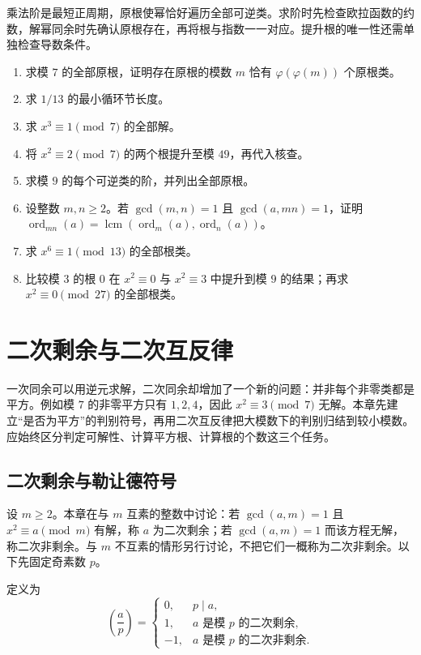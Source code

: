 \documentclass[UTF8,12pt,a4paper,fontset=fandol]{ctexbook}
\begin{document}
乘法阶是最短正周期，原根使幂恰好遍历全部可逆类。求阶时先检查欧拉函数的约数，解幂同余时先确认原根存在，再将根与指数一一对应。提升根的唯一性还需单独检查导数条件。

\begin{enumerate}
 \item 求模 $7$ 的全部原根，证明存在原根的模数 $m$ 恰有 $\varphi(\varphi(m))$ 个原根类。
 \item 求 $1/13$ 的最小循环节长度。
 \item 求 $x^3\equiv1\pmod7$ 的全部解。
 \item 将 $x^2\equiv2\pmod7$ 的两个根提升至模 $49$，再代入核查。
 \item\label{ex:order-list} 求模 $9$ 的每个可逆类的阶，并列出全部原根。
 \item\label{ex:order-composite} 设整数 $m,n\ge2$。若 $\gcd(m,n)=1$ 且 $\gcd(a,mn)=1$，证明 $\operatorname{ord}_{mn}(a)=\operatorname{lcm}(\operatorname{ord}_m(a),\operatorname{ord}_n(a))$。
 \item\label{ex:order-sixth} 求 $x^6\equiv1\pmod{13}$ 的全部根类。
 \item\label{ex:order-singular} 比较模 $3$ 的根 $0$ 在 $x^2\equiv0$ 与 $x^2\equiv3$ 中提升到模 $9$ 的结果；再求 $x^2\equiv0\pmod{27}$ 的全部根类。
\end{enumerate}

\chapter{二次剩余与二次互反律}
\label{ch:quadratic-residues}

一次同余可以用逆元求解，二次同余却增加了一个新的问题：并非每个非零类都是平方。例如模 $7$ 的非零平方只有 $1,2,4$，因此 $x^2\equiv3\pmod7$ 无解。本章先建立“是否为平方”的判别符号，再用二次互反律把大模数下的判别归结到较小模数。应始终区分判定可解性、计算平方根、计算根的个数这三个任务。

\section{二次剩余与勒让德符号}

设 $m\ge2$。本章在与 $m$ 互素的整数中讨论：若 $\gcd(a,m)=1$ 且 $x^2\equiv a\pmod m$ 有解，称 $a$ 为二次剩余；若 $\gcd(a,m)=1$ 而该方程无解，称二次非剩余。与 $m$ 不互素的情形另行讨论，不把它们一概称为二次非剩余。以下先固定奇素数 $p$。

\begin{definition}
定义为
\[
 \left(\frac ap\right)=
 \begin{cases}
 0,&p\mid a,\\
 1,&a\text{ 是模 }p\text{ 的二次剩余},\\
 -1,&a\text{ 是模 }p\text{ 的二次非剩余}.
 \end{cases}
\]
\end{definition}
\end{document}
